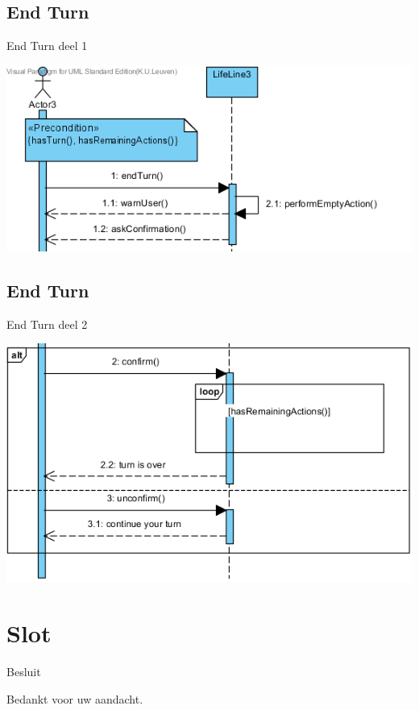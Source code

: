 \documentclass[t]{beamer}
\begin{document}
\subsection{End Turn}
\begin{frame}{End Turn deel 1}
\begin{center}
\includegraphics[scale=0.8]{images/SSDEndTurn1}
\end{center}
\end{frame}


\subsection{End Turn}
\begin{frame}{End Turn deel 2}
\begin{center}
\includegraphics[scale=0.7]{images/SSDEndTurn2}
\end{center}
\end{frame}


\section{Slot}
\begin{frame}{Besluit}
\vspace{0.8in}
\begin{center}
Bedankt voor uw aandacht.
\end{center}
\end{frame}
\end{document}

